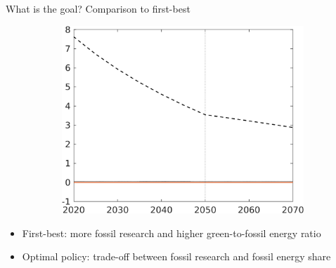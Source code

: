 \documentclass[11pt,aspectratio=169]{beamer}
\begin{document}
\begin{frame}{What is the goal? Comparison to first-best}
\begin{figure}[h!!]
\begin{subfigure}{0.4\textwidth}
					\includegraphics[width=1\textwidth]{../codding_model/own_basedOnFried/optimalPol_010922_revision/figures/all_13Sept22_Tplus30/sffsg_slides_CompEffOPT_T_NoTaus_regime4_opteff_knspil0_spillover0_noskill0_sep0_xgrowth0_countec0_PV1_etaa0.79_lgd0_lff1.png}
				\end{subfigure}
			\end{figure}
			\pause
			\vspace{3mm}
			\begin{block}{}
				\begin{itemize}
					\item<+-> First-best: more fossil research and higher green-to-fossil energy ratio
					\item<+-> Optimal policy: trade-off between fossil research and fossil energy share
				\end{itemize}
			\end{block}	
		\end{frame}
		
\end{document}
